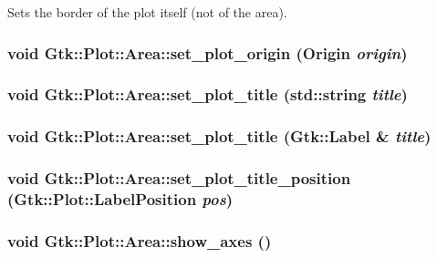 Sets the border of the plot itself (not of the area). \hypertarget{classGtk_1_1Plot_1_1Area_a2f056d2340f08b59ba04c4c890d98f0b}{
\subsubsection[{set\_\-plot\_\-origin}]{\setlength{\rightskip}{0pt plus 5cm}void Gtk::Plot::Area::set\_\-plot\_\-origin ({\bf Origin} {\em origin})}}
\label{classGtk_1_1Plot_1_1Area_a2f056d2340f08b59ba04c4c890d98f0b}
\hypertarget{classGtk_1_1Plot_1_1Area_aada203f9074e4b7e98631eff6d9a711e}{
\subsubsection[{set\_\-plot\_\-title}]{\setlength{\rightskip}{0pt plus 5cm}void Gtk::Plot::Area::set\_\-plot\_\-title (std::string {\em title})}}
\label{classGtk_1_1Plot_1_1Area_aada203f9074e4b7e98631eff6d9a711e}
\hypertarget{classGtk_1_1Plot_1_1Area_ab6fa6f90087da8c0cf42565c4ad55e10}{
\subsubsection[{set\_\-plot\_\-title}]{\setlength{\rightskip}{0pt plus 5cm}void Gtk::Plot::Area::set\_\-plot\_\-title (Gtk::Label \& {\em title})}}
\label{classGtk_1_1Plot_1_1Area_ab6fa6f90087da8c0cf42565c4ad55e10}
\hypertarget{classGtk_1_1Plot_1_1Area_a59e21443681606bfefc610ef7913e717}{
\subsubsection[{set\_\-plot\_\-title\_\-position}]{\setlength{\rightskip}{0pt plus 5cm}void Gtk::Plot::Area::set\_\-plot\_\-title\_\-position ({\bf Gtk::Plot::LabelPosition} {\em pos})}}
\label{classGtk_1_1Plot_1_1Area_a59e21443681606bfefc610ef7913e717}
\hypertarget{classGtk_1_1Plot_1_1Area_aba6e491e72d135eb80e8fa29cdc06165}{
\subsubsection[{show\_\-axes}]{\setlength{\rightskip}{0pt plus 5cm}void Gtk::Plot::Area::show\_\-axes ()}}
\label{classGtk_1_1Plot_1_1Area_aba6e491e72d135eb80e8fa29cdc06165}


